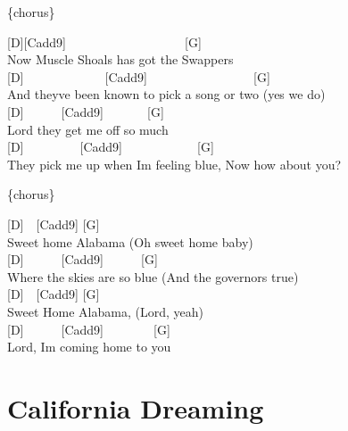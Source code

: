 \documentclass[
  letterpaper,
  a5paper]{memoir}
\begin{document}
\{chorus\}

{[}D{]}{[}Cadd9{]}~~~~~~~~~~~~~~~~~~~{[}G{]}\\
Now Muscle Shoals has got the Swappers\\
{[}D{]}~~~~~~~~~~~~~{[}Cadd9{]}~~~~~~~~~~~~~~~~~{[}G{]}\\
And they\textquotesingle ve been known to pick a song or two (yes we
do)\\
{[}D{]}~~~~~~{[}Cadd9{]}~~~~~~~{[}G{]}\\
Lord they get me off so much\\
{[}D{]}~~~~~~~~~{[}Cadd9{]}~~~~~~~~~~~~{[}G{]}~~~\\
They pick me up when I\textquotesingle m feeling blue, Now how about
you?

\{chorus\}

{[}D{]}~~{[}Cadd9{]} {[}G{]}~~~~~\\
Sweet home Alabama (Oh sweet home baby)\\
{[}D{]}~~~~~~{[}Cadd9{]}~~~~~~{[}G{]}~~~\\
Where the skies are so blue (And the governor\textquotesingle s true)\\
{[}D{]}~~{[}Cadd9{]} {[}G{]}\\
Sweet Home Alabama, (Lord, yeah)\\
{[}D{]}~~~~~~{[}Cadd9{]}~~~~~~~~{[}G{]}\\
Lord, I\textquotesingle m coming home to you

\hypertarget{california-dreaming}{%
\chapter{California Dreaming}\label{california-dreaming}}
\end{document}
